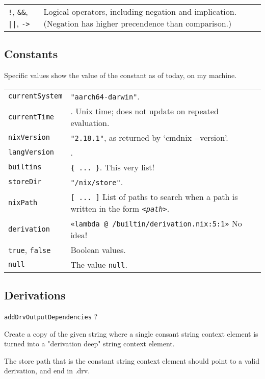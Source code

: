\documentclass[10pt, a4paper, landscape]{article}
\newcommand{\cmd}[1]{\texttt{#1}}
\begin{document}
\begin{multicols*}{3}
\begin{tabularx}{\columnwidth}{@{}l>{\raggedright\arraybackslash}X@{}}
  \cmd{!}, \cmd{\&\&}, \cmd{||}, \cmd{->} & Logical operators,
  including negation and implication. (Negation has higher precendence
  than comparison.) \\
  
\end{tabularx}

\subsection*{Constants}
Specific values show the value of the constant as of today, on my
machine.

\begin{tabularx}{\columnwidth}{@{}l>{\raggedright\arraybackslash}X@{}}
\cmd{currentSystem} & \cmd{"aarch64-darwin"}. \\
\cmd{currentTime} & 1700936742. Unix time; does not update on repeated
evaluation. \\
\cmd{nixVersion} & \cmd{"2.18.1"}, as returned by `cmd{nix -{}-version}'. \\
\cmd{langVersion} & 6. \\
\cmd{builtins} & \cmd{\{\ ...\ \}}. This very list! \\
\cmd{storeDir} & \cmd{"/nix/store"}. \\
\cmd{nixPath} & \cmd{[\ ...\ ]} List of paths to search when a path is
written in the form \cmd{<\emph{path}>}.  \\
\cmd{derivation} & \cmd{«lambda @ /builtin/derivation.nix:5:1»} No
idea! \\
\cmd{true}, \cmd{false} & Boolean values. \\
\cmd{null} & The value \cmd{null}. \\
\end{tabularx}

\subsection*{Derivations}

  \cmd{addDrvOutputDependencies} ?

    Create a copy of the given string where a single consant string context element is turned into a "derivation deep" string context element.

    The store path that is the constant string context element should point to a valid derivation, and end in .drv.


\end{multicols*}
\end{document}
